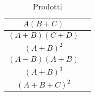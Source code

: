 \begin{table}
\centering
\begin{tabular}{cc}
\toprule$A(B+C)$  & \raisebox{-0.4\height}{ } \tabularnewline
\midrule $(A+B)(C+D)$&  \raisebox{-0.4\height}{}\tabularnewline
\midrule $(A+B)^2$& \raisebox{-0.4\height}{}\tabularnewline
\midrule $(A-B)(A+B)$& \raisebox{-0.4\height}{}\tabularnewline
\midrule $(A+B)^3$& \raisebox{-0.4\height}{}\tabularnewline
\midrule $(A+B+C)^2$& \raisebox{-0.4\height}{}\tabularnewline
\bottomrule
\end{tabular} 
\caption{Prodotti}
\label{tab:prodottipolinomi}
\end{table}
